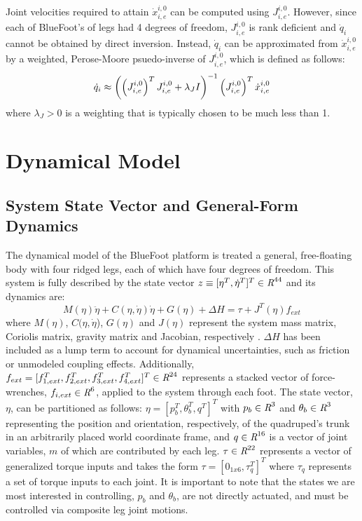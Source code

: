 			Joint velocities required to attain $\dot{x}^{i,0}_{i,e}$ can be computed using $J^{i,0}_{i,e}$. However, since each of BlueFoot's of legs had 4 degrees of freedom, $J^{i,0}_{i,e}$ is rank deficient and $\dot{q}_{i}$ cannot be obtained by direct inversion. Instead, $\dot{q}_{i}$ can be approximated from $\dot{x}^{i,0}_{i,e}$ by a weighted, Perose-Moore psuedo-inverse of $J^{i,0}_{i,e}$, which is defined as follows:
		\begin{equation}
			\dot{q}_{i} \approx \left( \left(J^{i,0}_{i,e}\right)^{T}J^{i,0}_{i,e} + \lambda_{J}I \right)^{-1} \left(J^{i,0}_{i,e}\right)^{T}\dot{x}^{i,0}_{i,e}
		\end{equation}
where $\lambda_{J}>0$ is a weighting that is typically chosen to be much less than 1.




	\section{Dynamical Model}
	

		\subsection{System State Vector and General-Form Dynamics}
		
			The dynamical model of the BlueFoot platform is treated a general, free-floating body with four ridged legs, each of which have four degrees of freedom. This system is fully described by the state vector $z \equiv [\eta^{T}, \dot{\eta}^{T}]^{T} \in \emph{R}^{44}$ and its dynamics are:
				\begin{equation}
					M(\eta)\ddot{\eta} + C(\eta,\dot{\eta})\dot{\eta} + G(\eta) + \Delta{H} = \tau + J^T(\eta) f_{ext} %
					\label{eq::normal_form_dynamics}
				\end{equation}
			where $M(\eta)$, $C(\eta,\dot{\eta}$), $G(\eta)$ and $J(\eta)$ represent the system mass matrix, Coriolis matrix, gravity matrix and Jacobian, respectively \cite{Wieber2006}. $\Delta{H}$ has been included as a lump term to account for dynamical uncertainties, such as friction or unmodeled coupling effects. Additionally, $f_{ext} = [ f_{1,ext}^{T},f_{2,ext}^{T},f_{3,ext}^{T},f_{4,ext}^{T}]^{T} \in \emph{R}^{24}$ represents a stacked vector of force-wrenches, $f_{i,ext} \in \emph{R}^{6}$, applied to the system through each \Ith foot. The state vector, $\eta$, can be partitioned as follows: $\eta = [ {p}_{b}^{T}, \theta_{b}^{T}, q^{T} ]^{T}$ with ${p}_{b} \in \emph{R}^{3}$ and $\theta_{b} \in \emph{R}^{3}$ representing the position and orientation, respectively, of the quadruped's trunk in an arbitrarily placed world coordinate frame, and $q \in \emph{R}^{16}$ is a vector of joint variables, $m$ of which are contributed by each leg. $\tau \in \emph{R}^{22}$ represents a vector of generalized torque inputs and takes the form $\tau = [ 0_{1x6}, \tau_{q}^{T} ]^{T}$ where $\tau_{q}$ represents a set of torque inputs to each joint. It is important to note that the states we are most interested in controlling, ${p}_{b}$ and $\theta_{b}$, are not directly actuated, and must be controlled via composite leg joint motions.		

